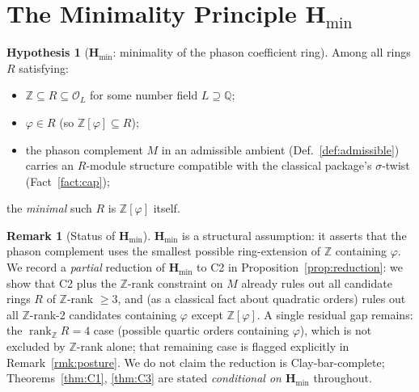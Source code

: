 \documentclass[11pt, a4paper]{amsart}
\theoremstyle{definition}
\newtheorem{remark}[theorem]{Remark}
\newtheorem{hypothesis}[theorem]{Hypothesis}
\newcommand{\Q}{\mathbb{Q}}
\newcommand{\Z}{\mathbb{Z}}
\newcommand{\rk}{\operatorname{rank}}
\newcommand{\Hmin}{\mathbf{H}_{\min}}
\newcommand{\Ophi}{\mathbb{Z}[\varphi]}
\begin{document}
\section{The Minimality Principle $\Hmin$}
\label{sec:Hmin}

\begin{hypothesis}[$\Hmin$: minimality of the phason coefficient ring]
\label{hyp:Hmin}
Among all rings $R$ satisfying:
\begin{itemize}
\item $\Z \subseteq R \subseteq \mathcal{O}_L$ for some number
  field $L \supseteq \Q$;
\item $\varphi \in R$ (so $\Ophi \subseteq R$);
\item the phason complement $M$ in an admissible ambient
  (Def.~\ref{def:admissible}) carries an $R$-module structure
  compatible with the classical package's $\sigma$-twist
  (Fact~\ref{fact:cap});
\end{itemize}
the \emph{minimal} such $R$ is $\Ophi$ itself.
\end{hypothesis}

\begin{remark}[Status of $\Hmin$]
\label{rmk:Hmin-status}
$\Hmin$ is a structural assumption: it asserts that the phason
complement uses the smallest possible ring-extension of $\Z$
containing $\varphi$. We record a \emph{partial} reduction of
$\Hmin$ to C2 in Proposition~\ref{prop:reduction}: we show that
C2 plus the $\Z$-rank constraint on $M$ already rules out all
candidate rings $R$ of $\Z$-rank $\geq 3$, and (as a classical
fact about quadratic orders) rules out all $\Z$-rank-2
candidates containing $\varphi$ except $\Ophi$. A single
residual gap remains: the $\rk_\Z R = 4$ case (possible quartic
orders containing $\varphi$), which is not excluded by $\Z$-rank
alone; that remaining case is flagged explicitly in
Remark~\ref{rmk:posture}. We do not claim the reduction is
Clay-bar-complete; Theorems~\ref{thm:C1}, \ref{thm:C3} are
stated \emph{conditional on $\Hmin$} throughout.
\end{remark}
\end{document}
